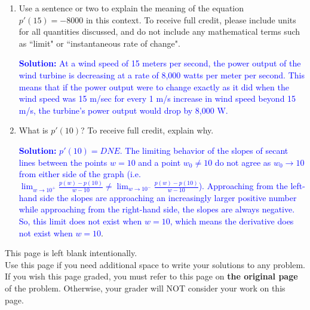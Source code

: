 \documentclass[11pt]{article}
\begin{document}
\begin{enumerate}
\begin{enumerate}
    \textcolor{blue}{\textbf{Solution:} At a wind speed of 15 meters per second, the wind turbine produces 50,000 watts of power. This means that when the wind blows at 15 m/s, the power output of the turbine is 50,000 W.}

    \vfill 

    \item Use a sentence or two to explain the meaning of the equation $p'(15)=-8000$ in this context. 
    To receive full credit, please include units for all quantities discussed, and do not include any mathematical terms such as ``limit" or ``instantaneous rate of change".
    \vspace{4pt}

    \textcolor{blue}{\textbf{Solution:} At a wind speed of 15 meters per second, the power output of the wind turbine is decreasing at a rate of 8,000 watts per meter per second. This means that if the power output were to change exactly as it did when the wind speed was 15 m/sec for every 1 m/s increase in wind speed beyond 15 m/s, the turbine’s power output would drop by 8,000 W.}

    \vfill

    \item What is $p'(10)$? To receive full credit, explain why.

    \vspace{4pt}

    \textcolor{blue}{\textbf{Solution:} $p'(10)=DNE$. The limiting behavior of the slopes of secant lines between the points $w = 10$ and a point $w_0 \neq 10$ do not agree as $w_0 \to 10$ from either side of the graph (i.e. $\displaystyle \lim_{w \to 10^{+}} \frac{p(w) - p(10)}{w - 10} \neq \lim_{w \to 10^{-}} \frac{p(w) - p(10)}{w - 10}$). Approaching from the left-hand side the slopes are approaching an increasingly larger positive number while approaching from the right-hand side, the slopes are always negative. So, this limit does not exist when $w = 10$, which means the derivative does not exist when $w = 10$}.
    
\end{enumerate}




\newpage

This page is left blank intentionally.\\

Use this page if you need additional space to write your solutions to any problem. \\

If you wish this page graded, you must refer to this page on \textbf{the original page} of the problem. Otherwise, your grader will NOT consider your work on this page.

\end{enumerate}
\end{document}
